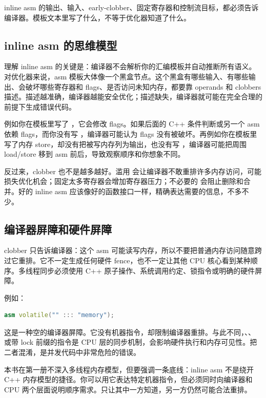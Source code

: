 \begin{warningbox}
inline asm 的输出、输入、early-clobber、固定寄存器和控制流目标，都必须告诉编译器。模板文本里写了什么，不等于优化器知道了什么。
\end{warningbox}

\subsection{inline asm 的思维模型}

理解 inline asm 的关键是：编译器不会解析你的汇编模板并自动推断所有语义。对优化器来说，asm 模板大体像一个黑盒节点。这个黑盒有哪些输入、有哪些输出、会破坏哪些寄存器和 flags、是否访问未知内存，都要靠 operands 和 clobbers 描述。描述越准确，编译器越能安全优化；描述缺失，编译器就可能在完全合理的前提下生成错误代码。

例如你在模板里写了 ，它会修改 flags。如果后面的 C++ 条件判断或另一个 asm 依赖 flags，而你没有写 ，编译器可能认为 flags 没有被破坏。再例如你在模板里写了内存 store，却没有把被写内存列为输出，也没有写 ，编译器可能把周围 load/store 移到 asm 前后，导致观察顺序和你想象不同。

反过来，clobber 也不是越多越好。滥用  会让编译器不敢重排许多内存访问，可能损失优化机会；固定太多寄存器会增加寄存器压力；不必要的  会阻止删除和合并。好的 inline asm 应该像好的函数接口一样，精确表达需要的信息，不多不少。

\subsection{编译器屏障和硬件屏障}

 clobber 只告诉编译器：这个 asm 可能读写内存，所以不要把普通内存访问随意跨过它重排。它不一定生成任何硬件 fence，也不一定让其他 CPU 核心看到某种顺序。多线程同步必须使用 C++ 原子操作、系统调用约定、锁指令或明确的硬件屏障。

例如：

\begin{lstlisting}[language=C++]
asm volatile("" ::: "memory");
\end{lstlisting}

这是一种空的编译器屏障。它没有机器指令，却限制编译器重排。与此不同，、、 或带 lock 前缀的指令是 CPU 层的同步机制，会影响硬件执行和内存可见性。把二者混淆，是并发代码中非常危险的错误。

本书在第一册不深入多线程内存模型，但要强调一条底线：inline asm 不是绕开 C++ 内存模型的捷径。你可以用它表达特定机器指令，但必须同时向编译器和 CPU 两个层面说明顺序需求。只让其中一方知道，另一方仍然可能合法重排。


